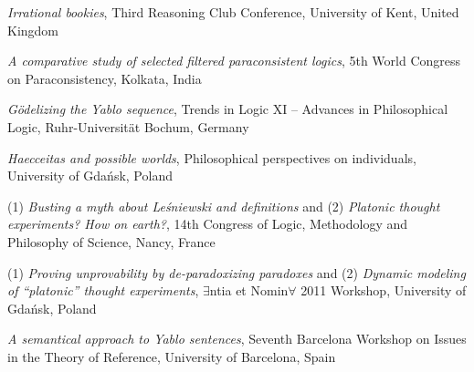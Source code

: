 \documentclass[10pt, a4paper]{article}
\newcommand{\years}[1]{\marginnote{\normalsize #1}}
\begin{document}
\vspace{0.5mm}

 \emph{Irrational bookies}, Third Reasoning Club Conference, University of Kent, United Kingdom


\vspace{0.5mm}


 \emph{A comparative study of selected filtered paraconsistent logics}, 5th World Congress on Paraconsistency,  Kolkata, India


\vspace{0.5mm}






\years{2012} \emph{G{\"o}delizing the Yablo sequence}, Trends in Logic XI -- Advances in Philosophical Logic,  Ruhr-Uni\-ver\-si\-t{\"a}t Bochum, Germany


\vspace{0.5mm}



\years{2011} \emph{Haecceitas and possible worlds}, Philosophical perspectives on individuals,  University of Gda\'nsk, Poland


\vspace{0.5mm}






(1) \emph{Busting a myth about Le\' sniewski and definitions} and (2) \emph{Platonic thought experiments? How on earth?}, 14th Congress of Logic, Methodology and Philosophy of Science,  Nancy, France


\vspace{0.5mm}


(1) \emph{Proving unprovability by de-paradoxizing paradoxes} and (2) \emph{Dynamic modeling of ``platonic'' thought experiments}, $\exists$ntia et Nomin$\forall$ 2011 Workshop,  University of Gda\' nsk, Poland





\vspace{0.5mm}



\emph{A semantical approach to Yablo sentences}, Seventh Barcelona Workshop on Issues in the Theory of Re\-fe\-ren\-ce,  University of Barcelona, Spain


\vspace{0.5mm}
\end{document}
